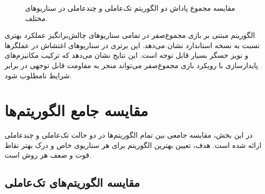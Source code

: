 \begin{figure}[H]
	\caption{مقایسه مجموع پاداش دو الگوریتم تک‌عاملی و چندعاملی  در سناریوهای مختلف. 
		}
	\label{fig:td3_robustness_violin}
\end{figure}

الگوریتم  مبتنی بر بازی مجموع‌صفر در تمامی سناریوهای چالش‌برانگیز عملکرد بهتری نسبت به نسخه استاندارد نشان می‌دهد. این برتری در سناریوهای اغتشاش در عملگرها و نویز حسگر بسیار قابل توجه است. این نتایج نشان می‌دهد که ترکیب مکانیزم‌های پایدارسازی  با رویکرد بازی مجموع‌صفر می‌تواند منجر به مقاومت قابل توجهی در برابر شرایط نامطلوب شود.

\section{مقایسه جامع الگوریتم‌ها}

در این بخش، مقایسه جامعی بین تمام الگوریتم‌ها در دو حالت تک‌عاملی و چندعاملی ارائه شده است. هدف، تعیین بهترین الگوریتم برای هر سناریوی خاص و درک بهتر نقاط قوت و ضعف هر روش است.

\subsection{مقایسه الگوریتم‌های تک‌عاملی}

